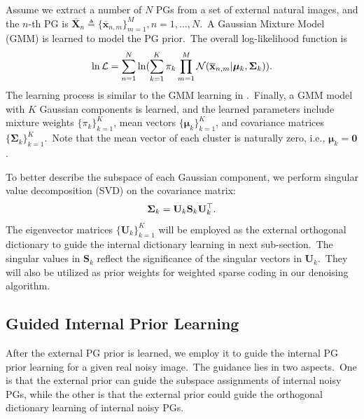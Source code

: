 \documentclass[10pt,twocolumn,letterpaper]{article}
\begin{document}
Assume we extract a number of $N$ PGs from a set of external natural images, and the $n$-th PG is $\mathbf{\overline{X}}_{n}\triangleq \{\mathbf{\overline{x}}_{n,m}\}_{m=1}^{M}, n=1,...,N$.\ A Gaussian Mixture Model (GMM) is learned to model the PG prior.\ The overall log-likelihood function is
\vspace{-2mm}
\begin{equation}\label{equ1}\vspace{-2mm}
\begin{split}
\ln\mathcal{L}=\sum_{n=1}^{N} \ln(\sum_{k=1}^{K}\pi_{k}\prod_{m=1}^{M}\mathcal{N}(\mathbf{\overline{x}}_{n,m}|\bm{\mu}_{k},\mathbf{\Sigma}_{k})).
\end{split}
\end{equation}
The learning process is similar to the GMM learning in \cite{pgpd,epll}.\ Finally, a GMM model with $K$ Gaussian components is learned, and the learned parameters include mixture weights $\{\pi_{k}\}_{k=1}^{K}$, mean vectors $\{\bm{\mu}_{k}\}_{k=1}^{K}$, and covariance matrices $\{\mathbf{\Sigma}_{k}\}_{k=1}^{K}$.\ Note that the mean vector of each cluster is naturally zero, i.e., $\bm{\mu}_{k}=\mathbf{0}$.  

To better describe the subspace of each Gaussian component, we perform singular value decomposition (SVD) on the covariance matrix:
\vspace{-2mm}
\begin{equation}\label{equ2}\vspace{-2mm}
\mathbf{\Sigma}_{k}=\mathbf{U}_{k}\mathbf{S}_{k}\mathbf{U}_{k}^{\top}.
\end{equation}
The eigenvector matrices $\{\mathbf{U}_{k}\}_{k=1}^{K}$ will be employed as the external orthogonal dictionary to guide the internal dictionary learning in next sub-section.\ The singular values in $\mathbf{S}_{k}$ reflect the significance of the singular vectors in $\mathbf{U}_{k}$.\ They  will also be utilized as prior weights for weighted sparse coding in our denoising algorithm.


\subsection{Guided Internal Prior Learning}

After the external PG prior is learned, we employ it to guide the internal PG prior learning for a given real noisy image.\ The guidance lies in two aspects.\ One is that the external prior can guide the subspace assignments of internal noisy PGs, while the other is that the external prior could guide the orthogonal dictionary learning of internal noisy PGs.
\end{document}
